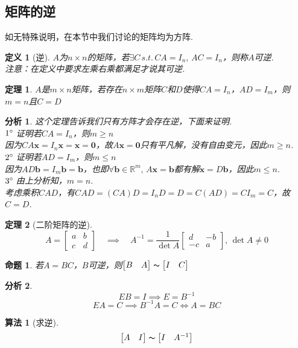 \documentclass[11pt,UTF8]{ctexart}
\newtheorem{theorem}{定理}
\newtheorem{algorithm}{算法}
\newtheorem{definition}{定义}
\newtheorem{proposition}{命题}
\newtheorem*{analysis}{分析}
\def\vx{\mathbf{x}}
\newcommand{\vb}[1]{\mathbf{#1}}
\begin{document}
\subsection{矩阵的逆}
如无特殊说明，在本节中我们讨论的矩阵均为方阵.
\begin{definition}[逆]
$A$为$n\times n$的矩阵，若$\exists C\,s.t.\,CA=I_n,\,AC=I_n$，则称$A$可逆.\\
注意：在定义中要求左乘右乘都满足才说其可逆.
\end{definition}
\begin{theorem}
$A$是$m\times n$矩阵，若存在$n\times m$矩阵$C$和$D$使得$CA=I_n$，$AD=I_m$，则$m=n$且$C=D$
\end{theorem}
\begin{analysis}
这个定理告诉我们只有方阵才会存在逆，下面来证明.\\
$1\degree\;$证明若$CA=I_n$，则$m\geq n$\\
因为$CA\vx=I_n\vx=\vx=\vb{0}$，故$A\vx=\vb{0}$只有平凡解，没有自由变元，因此$m\geq n$.\\
$2\degree\;$证明若$AD=I_m$，则$m\leq n$\\
因为$AD\vb{b}=I_m\vb{b}=\vb{b}$，也即$\forall \vb{b}\in\mathbb{R}^m,\,A\vx=\vb{b}$都有解$\vx=D\vb{b}$，因此$m\leq n$.\\
$3\degree\;$由上分析知，$m=n$.\\
考虑乘积$CAD$，有$CAD=(CA)D=I_nD=D=C(AD)=CI_m=C$，故$C=D$.
\end{analysis}
\begin{theorem}[二阶矩阵的逆]
\[A=\begin{bmatrix}
a&b\\c&d
\end{bmatrix}\quad\implies\quad
A^{-1}=\dfrac{1}{\det A}\begin{bmatrix}
d&-b\\-c&a
\end{bmatrix},\,\det A\ne 0\]
\end{theorem}
\begin{proposition}
\label{row_redu_alg}
若$A=BC$，$B$可逆，则$\begin{bmatrix}B&A\end{bmatrix}\thicksim\begin{bmatrix}I&C\end{bmatrix}$
\end{proposition}
\begin{analysis}
\[EB=I\implies E=B^{-1}\]
\[EA=C\implies B^{-1}A=C\iff A=BC\]
\end{analysis}
\begin{algorithm}[求逆]
\[\begin{bmatrix}A&I\end{bmatrix}\thicksim\begin{bmatrix}I&A^{-1}\end{bmatrix}\]
\end{algorithm}
\end{document}
